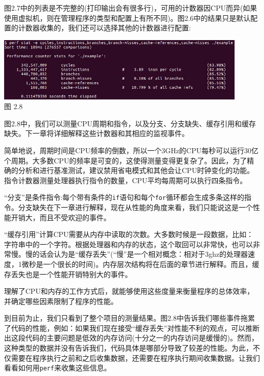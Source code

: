 图2.7中的列表是不完整的(打印输出会有很多行)，可用的计数器因CPU而异(如果使用虚拟机，则在管理程序的类型和配置上有所不同)。图2.6中的结果只是默认配置的计数器收集的，我们还可以选择其他的计数器进行配置:

\begin{center}
\includegraphics[width=0.9\textwidth]{content/1/chapter2/images/8.jpg}\\
图 2.8
\end{center}

图2.8中，我们可以测量CPU周期和指令，以及分支、分支缺失、缓存引用和缓存缺失。下一章将详细解释这些计数器和其相应的监视事件。

简单地说，周期时间是CPU频率的倒数，所以一个3GHz的CPU每秒可以运行30亿个周期。大多数CPU的频率是可变的，这使得测量变得更复杂了。因此，为了精确的分析和进行基准测试，建议禁用省电模式和其他会让CPU时钟变化的功能。指令计数器测量处理器执行指令的数量，CPU平均每周期可以执行四条指令。

“分支”是条件指令:每个带有条件的\texttt{if}语句和每个\texttt{for}循环都会生成多条这样的指令。分支缺失在下一章进行解释，现在从性能的角度来看，我们只能说这是一个性能开销大，而且不受欢迎的事件。

“缓存引用”计算CPU需要从内存中读取的次数。大多数时候是一段数据，比如：字符串中的一个字符。根据处理器和内存的状态，这个取回可以非常快，也可以非常慢。慢的话会认为是“缓存丢失”(“慢”是一个相对概念：相对于3ghz的处理器速度，1微秒是一个很长的时间)。内存层次结构将在后面的章节进行解释。而且，缓存丢失也是一个性能开销特别大的事件。

理解了CPU和内存的工作方式后，就能够使用这些度量来衡量程序的总体效率，并确定哪些因素限制了程序的性能。

到目前为止，我们只看到了整个项目的测量结果。图2.8中告诉我们哪些事件拖累了代码的性能，例如：如果我们现在接受“缓存丢失”对性能不利的观点，可以推断出这段代码的主要问题是低效的内存访问(十分之一的内存访问是缓慢的)。然而，这种类型的数据并没有告诉我们，代码具体是哪部分导致了较差的性能。为此，不仅需要在程序执行之前和之后收集数据，还需要在程序执行期间收集数据。让我们看看如何用\texttt{perf}来收集这些信息。

